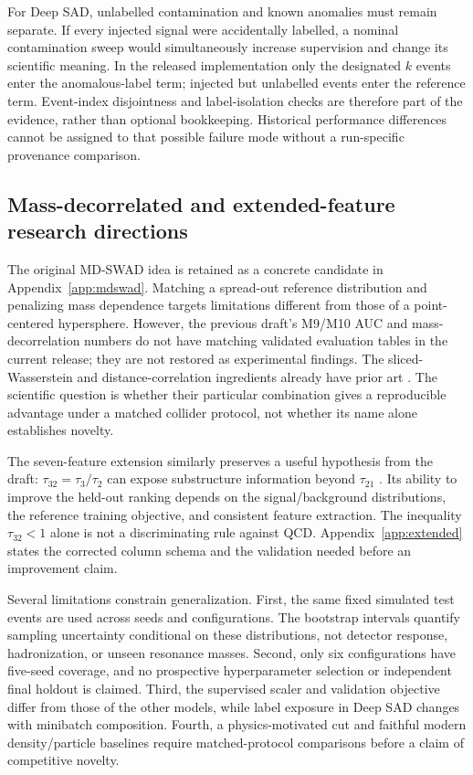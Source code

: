 \documentclass[reprint,aps,pra,amsmath,amssymb,floatfix,raggedbottom]{revtex4-2}
\begin{document}
For Deep SAD, unlabelled contamination and known anomalies must remain separate. If every injected signal were accidentally labelled, a nominal contamination sweep would simultaneously increase supervision and change its scientific meaning. In the released implementation only the designated $k$ events enter the anomalous-label term; injected but unlabelled events enter the reference term. Event-index disjointness and label-isolation checks are therefore part of the evidence, rather than optional bookkeeping. Historical performance differences cannot be assigned to that possible failure mode without a run-specific provenance comparison.

\subsection{Mass-decorrelated and extended-feature research directions}
The original MD-SWAD idea is retained as a concrete candidate in Appendix~\ref{app:mdswad}. Matching a spread-out reference distribution and penalizing mass dependence targets limitations different from those of a point-centered hypersphere. However, the previous draft's M9/M10 AUC and mass-decorrelation numbers do not have matching validated evaluation tables in the current release; they are not restored as experimental findings. The sliced-Wasserstein and distance-correlation ingredients already have prior art \cite{sliced,disco}. The scientific question is whether their particular combination gives a reproducible advantage under a matched collider protocol, not whether its name alone establishes novelty.

The seven-feature extension similarly preserves a useful hypothesis from the draft: $\tau_{32}=\tau_3/\tau_2$ can expose substructure information beyond $\tau_{21}$ \cite{tau}. Its ability to improve the held-out ranking depends on the signal/background distributions, the reference training objective, and consistent feature extraction. The inequality $\tau_{32}<1$ alone is not a discriminating rule against QCD. Appendix~\ref{app:extended} states the corrected column schema and the validation needed before an improvement claim.

Several limitations constrain generalization. First, the same fixed simulated test events are used across seeds and configurations. The bootstrap intervals quantify sampling uncertainty conditional on these distributions, not detector response, hadronization, or unseen resonance masses. Second, only six configurations have five-seed coverage, and no prospective hyperparameter selection or independent final holdout is claimed. Third, the supervised scaler and validation objective differ from those of the other models, while label exposure in Deep SAD changes with minibatch composition. Fourth, a physics-motivated cut and faithful modern density/particle baselines require matched-protocol comparisons before a claim of competitive novelty.
\end{document}
